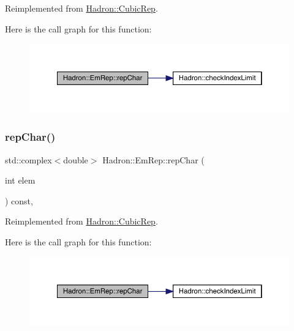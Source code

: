 Reimplemented from \mbox{\hyperlink{structHadron_1_1CubicRep_af45227106e8e715e84b0af69cd3b36f8}{Hadron\+::\+Cubic\+Rep}}.

Here is the call graph for this function\+:
\nopagebreak
\begin{figure}[H]
\begin{center}
\leavevmode
\includegraphics[width=350pt]{d6/d4b/structHadron_1_1EmRep_ab57e91b1997f75e0eff8a03bac6f34db_cgraph}
\end{center}
\end{figure}
\mbox{\label{structHadron_1_1EmRep_ab57e91b1997f75e0eff8a03bac6f34db}} 
\subsubsection{\texorpdfstring{repChar()}{repChar()}\hspace{0.1cm}{\footnotesize\ttfamily [3/3]}}
{\footnotesize\ttfamily std\+::complex$<$double$>$ Hadron\+::\+Em\+Rep\+::rep\+Char (\begin{DoxyParamCaption}\item[{int}]{elem }\end{DoxyParamCaption}) const\hspace{0.3cm}{\ttfamily [inline]}, {\ttfamily [virtual]}}



Reimplemented from \mbox{\hyperlink{structHadron_1_1CubicRep_af45227106e8e715e84b0af69cd3b36f8}{Hadron\+::\+Cubic\+Rep}}.

Here is the call graph for this function\+:
\nopagebreak
\begin{figure}[H]
\begin{center}
\leavevmode
\includegraphics[width=350pt]{d6/d4b/structHadron_1_1EmRep_ab57e91b1997f75e0eff8a03bac6f34db_cgraph}
\end{center}
\end{figure}
\mbox{\label{structHadron_1_1EmRep_a8c91198aaf2473fd63a22c16ed7415f2}} 
